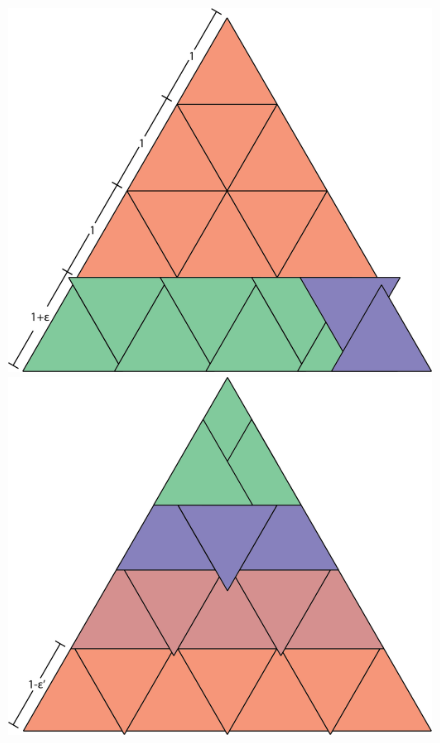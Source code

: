 \documentclass[a4paper]{amsart}
\theoremstyle{plain}
\theoremstyle{definition}
\begin{document}
\begin{figure}[h]
   \begin{minipage}{0.5\textwidth}
     \centering
     \includegraphics[width=0.9\linewidth]{triangle1.png}
     \caption{}
     \label{fig:triangle1}
   \end{minipage}\hfill
   \begin{minipage}{0.5\textwidth}
     \centering
     \includegraphics[width=0.9\linewidth]{triangle2.png}
     \caption{}
     \label{fig:triangle2}
   \end{minipage}
\end{figure}
\end{document}
